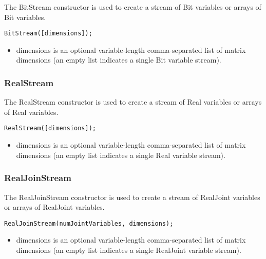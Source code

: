
The BitStream constructor is used to create a stream of Bit variables or arrays of Bit variables.

\begin{lstlisting}
BitStream([dimensions]);
\end{lstlisting}

\begin{itemize}
\item dimensions is an optional variable-length comma-separated list of matrix dimensions (an empty list indicates a single Bit variable stream).
\end{itemize}

\subsubsection{RealStream}


The RealStream constructor is used to create a stream of Real variables or arrays of Real variables.

\begin{lstlisting}
RealStream([dimensions]);
\end{lstlisting}

\begin{itemize}
\item dimensions is an optional variable-length comma-separated list of matrix dimensions (an empty list indicates a single Real variable stream).
\end{itemize}

\subsubsection{RealJoinStream}


The RealJoinStream constructor is used to create a stream of RealJoint variables or arrays of RealJoint variables.

\begin{lstlisting}
RealJoinStream(numJointVariables, dimensions);
\end{lstlisting}

\begin{itemize}
\item dimensions is an optional variable-length comma-separated list of matrix dimensions (an empty list indicates a single RealJoint variable stream).
\end{itemize}


